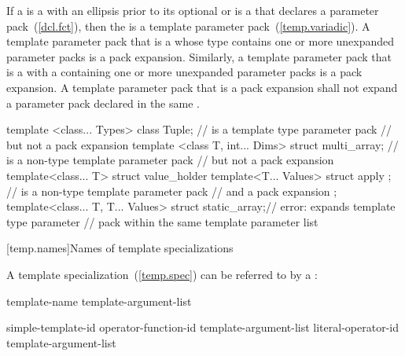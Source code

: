 \pnum
If a  is a
 with an ellipsis prior to its
optional  or is a
 that declares a parameter
pack~(\ref{dcl.fct}), then the 
is a template parameter pack~(\ref{temp.variadic}).
A template parameter pack that is a  whose type
contains one or more unexpanded parameter packs is a pack expansion. Similarly,
a template parameter pack that is a  with a
 containing one or more unexpanded
parameter packs is a pack expansion. A template parameter pack that is a pack
expansion shall not expand a parameter pack declared in the same
.
\begin{example}
\begin{codeblock}
template <class... Types> class Tuple;                //  is a template type parameter pack
                                                      // but not a pack expansion
template <class T, int... Dims> struct multi_array;   //  is a non-type template parameter pack
                                                      // but not a pack expansion
template<class... T> struct value_holder {
  template<T... Values> struct apply { };             //  is a non-type template parameter pack
                                                      // and a pack expansion
};
template<class... T, T... Values> struct static_array;// error:  expands template type parameter
                                                      // pack  within the same template parameter list
\end{codeblock}
\end{example}

[temp.names]{Names of template specializations}

\pnum
A template specialization~(\ref{temp.spec}) can be referred to by a
:

\begin{bnf}
\br
  template-name \terminal{<} template-argument-list\opt{} \terminal{>}
\end{bnf}

\begin{bnf}
\br
  simple-template-id\br
  operator-function-id \terminal{<} template-argument-list\opt{} \terminal{>}\br
  literal-operator-id \terminal{<} template-argument-list\opt{} \terminal{>}
\end{bnf}

